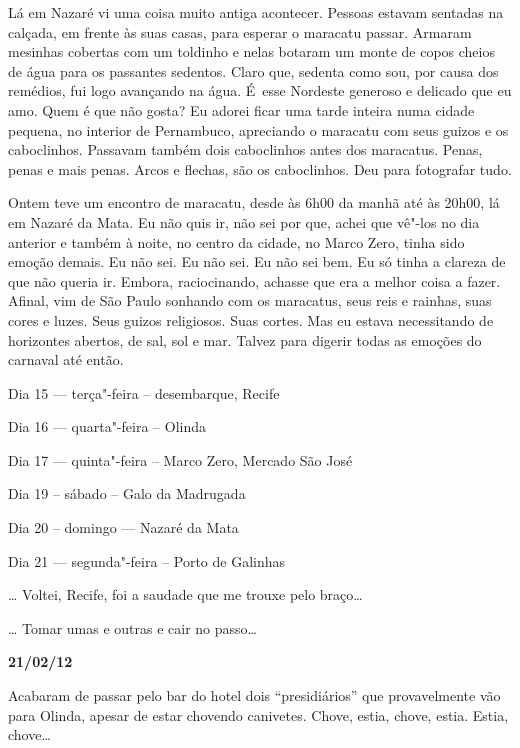 Lá em Nazaré vi uma coisa muito antiga acontecer. Pessoas estavam
sentadas na calçada, em frente às suas casas, para esperar o maracatu
passar. Armaram mesinhas cobertas com um toldinho e nelas botaram um
monte de copos cheios de água para os passantes sedentos. Claro que,
sedenta como sou, por causa dos remédios, fui logo avançando na água. É~esse Nordeste generoso e delicado que eu amo. Quem é que não gosta? Eu
adorei ficar uma tarde inteira numa cidade pequena, no interior de
Pernambuco, apreciando o maracatu com seus guizos e os caboclinhos.
Passavam também dois caboclinhos antes dos maracatus. Penas, penas e
mais penas. Arcos e flechas, são os caboclinhos. Deu para fotografar
tudo.

Ontem teve um encontro de maracatu, desde às 6h00 da manhã até às 20h00,
lá em Nazaré da Mata. Eu não quis ir, não sei por que, achei que vê"-los
no dia anterior e também à noite, no centro da cidade, no Marco Zero,
tinha sido emoção demais. Eu não sei. Eu não sei. Eu não sei bem. Eu só
tinha a clareza de que não queria ir. Embora, raciocinando, achasse que
era a melhor coisa a fazer. Afinal, vim de São Paulo sonhando com os
maracatus, seus reis e rainhas, suas cores e luzes. Seus guizos
religiosos. Suas cortes. Mas eu estava necessitando de horizontes
abertos, de sal, sol e mar. Talvez para digerir todas as emoções do
carnaval até então.

Dia 15 --- terça"-feira -- desembarque, Recife

Dia 16 --- quarta"-feira -- Olinda

Dia 17 --- quinta"-feira -- Marco Zero, Mercado São José

Dia 19 -- sábado -- Galo da Madrugada

Dia 20 -- domingo --- Nazaré da Mata

Dia 21 --- segunda"-feira -- Porto de Galinhas

… Voltei, Recife, foi a saudade que me trouxe pelo braço…

… Tomar umas e outras e cair no passo…

\begin{center}\asterisc{}\end{center}


\begin{flushright}\textbf{21/02/12}\end{flushright}


Acabaram de passar pelo bar do hotel dois ``presidiários'' que
provavelmente vão para Olinda, apesar de estar chovendo canivetes.
Chove, estia, chove, estia. Estia, chove…

